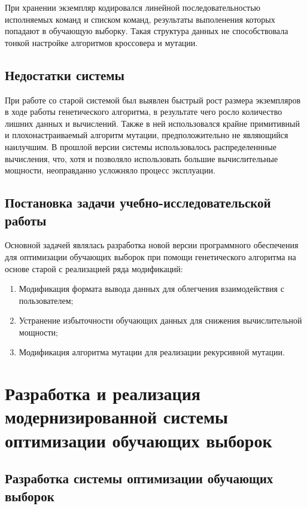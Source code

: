 \documentclass[utf8,usehyperref,14pt]{G7-32}
\begin{document}
При хранении экземпляр кодировался линейной последовательностью исполняемых команд и списком команд, результаты выполенения которых попадают в обучающую выборку. Такая структура данных не способствовала тонкой настройке алгоритмов кроссовера и мутации.

\section{Недостатки системы}
При работе со старой системой был выявлен быстрый рост размера экземпляров в ходе работы генетического алгоритма, в результате чего росло количество лишних данных и вычислений. Также в ней использовался крайне примитивный и плохонастраиваемый алгоритм мутации, предположительно не являющийся наилучшим. В прошлой версии системы использовалось распределеннные вычисления, что, хотя и позволяло использовать большие вычислительные мощности, неоправданно усложняло процесс эксплуации. 
\section{Постановка задачи учебно-исследовательской работы}
Основной задачей являлась разработка новой версии программного обеспечения для оптимизации обучающих выборок при помощи генетического алгоритма на основе старой с реализацией ряда модификаций:
\begin{enumerate}
\item Модификация формата вывода данных для облегчения взаимодействия с пользователем;
\item Устранение избыточности обучающих данных для снижения вычислительной мощности;
\item Модификация алгоритма мутации для реализации рекурсивной мутации.
\end{enumerate}

\chapter{Разработка и реализация модернизированной системы оптимизации обучающих выборок}
\section{Разработка системы оптимизации обучающих выборок}
\end{document}
